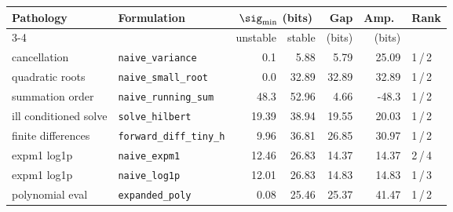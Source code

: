 \begin{tabular}{llrrrrl}
\toprule
Pathology & Formulation & \multicolumn{2}{c}{$\sig_{\min}$ (bits)} & Gap & Amp.\ & Rank \\
\cmidrule(lr){3-4}
 & & unstable & stable & (bits) & (bits) & \\
\midrule
cancellation & \texttt{naive\_variance} & 0.1 & 5.88 & 5.79 & 25.09 & 1\,/\,2 \\
quadratic roots & \texttt{naive\_small\_root} & 0.0 & 32.89 & 32.89 & 32.89 & 1\,/\,2 \\
summation order & \texttt{naive\_running\_sum} & 48.3 & 52.96 & 4.66 & -48.3 & 1\,/\,2 \\
ill conditioned solve & \texttt{solve\_hilbert} & 19.39 & 38.94 & 19.55 & 20.03 & 1\,/\,2 \\
finite differences & \texttt{forward\_diff\_tiny\_h} & 9.96 & 36.81 & 26.85 & 30.97 & 1\,/\,2 \\
expm1 log1p & \texttt{naive\_expm1} & 12.46 & 26.83 & 14.37 & 14.37 & 2\,/\,4 \\
expm1 log1p & \texttt{naive\_log1p} & 12.01 & 26.83 & 14.83 & 14.83 & 1\,/\,3 \\
polynomial eval & \texttt{expanded\_poly} & 0.08 & 25.46 & 25.37 & 41.47 & 1\,/\,2 \\
\bottomrule
\end{tabular}

